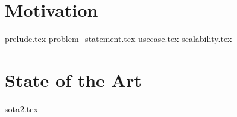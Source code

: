 \chapter{Motivation}\label{cha:motivation}
{prelude.tex}
{problem_statement.tex}
{usecase.tex}
{scalability.tex}
\chapter{State of the Art}\label{cha:sota}
{sota2.tex}
